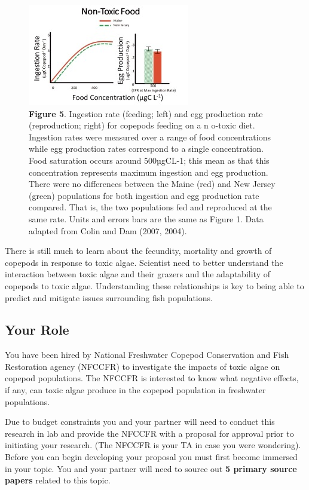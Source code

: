 \documentclass[
]{book}
\begin{document}
\begin{figure}
\centering
\includegraphics{images/figure5.png}
\caption{\textbf{Figure 5}. Ingestion rate (feeding; left) and egg production rate (reproduction; right) for copepods feeding on a n o-toxic diet. Ingestion rates were measured over a range of food concentrations while egg production rates correspond to a single concentration. Food saturation occurs around 500µgCL-1; this mean as that this concentration represents maximum ingestion and egg production. There were no differences between the Maine (red) and New Jersey (green) populations for both ingestion and egg production rate compared. That is, the two populations fed and reproduced at the same rate. Units and errors bars are the same as Figure 1. Data adapted from Colin and Dam (2007, 2004).}
\end{figure}

There is still much to learn about the fecundity, mortality and growth of copepods in response to toxic algae. Scientist need to better understand the interaction between toxic algae and their grazers and the adaptability of copepods to toxic algae. Understanding these relationships is key to being able to predict and mitigate issues surrounding fish populations.

\hypertarget{your-role}{%
\subsection*{Your Role}\label{your-role}}

You have been hired by National Freshwater Copepod Conservation and Fish Restoration agency (NFCCFR) to investigate the impacts of toxic algae on copepod populations. The NFCCFR is interested to know what negative effects, if any, can toxic algae produce in the copepod population in freshwater populations.

Due to budget constraints you and your partner will need to conduct this research in lab and provide the NFCCFR with a proposal for approval prior to initiating your research. (The NFCCFR is your TA in case you were wondering). Before you can begin developing your proposal you must first become immersed in your topic. You and your partner will need to source out \textbf{5 primary source papers} related to this topic.
\end{document}
